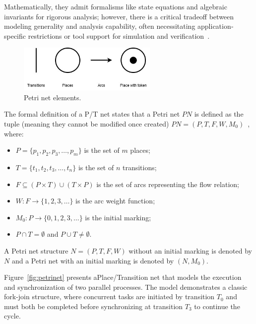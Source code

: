  Mathematically, they admit formalisms like state equations and algebraic invariants for rigorous analysis; however, there is a critical tradeoff between modeling generality and analysis capability, often necessitating application‐specific restrictions or tool support for simulation and verification~\cite{murata}.


\begin{figure}[htbp]
  \centering
  \includegraphics[width=0.6\textwidth]{Chapters/Figures/petri_image.jpg}
  \caption{Petri net elements.}
  \label{fig:petri_diagrama}
\end{figure}



The formal definition of a P/T net states that a Petri net \( PN \) is defined as the tuple (meaning they cannot be modified once created) \( PN = (P, T, F, W, M_0) \)~\cite{murata}, where:


\begin{itemize}
    \item \( P = \{ p_1, p_2, p_3, \ldots, p_m \} \) is the set of \( m \) places;
    \item \( T = \{ t_1, t_2, t_3, \ldots, t_n \} \) is the set of \( n \) transitions;
    \item \( F \subseteq (P \times T) \cup (T \times P) \) is the set of arcs representing the flow relation;
    \item \( W : F \to \{1,2,3,\ldots\} \) is the arc weight function;
    \item \( M_0 : P \to \{0,1,2,3,\ldots\} \) is the initial marking;
    \item \( P \cap T = \emptyset \) and \( P \cup T \neq \emptyset \).
\end{itemize}

A Petri net structure \( N = (P, T, F, W) \) without an initial marking is denoted by \( N \) and a Petri net with an initial marking is denoted by \( (N, M_0) \).


Figure~\ref{fig:petrinet} presents aPlace/Transition net that models the execution and synchronization of two parallel processes. The model demonstrates a classic fork-join structure, where concurrent tasks are initiated by transition $T_0$ and must both be completed before synchronizing at transition $T_3$ to continue the cycle.



